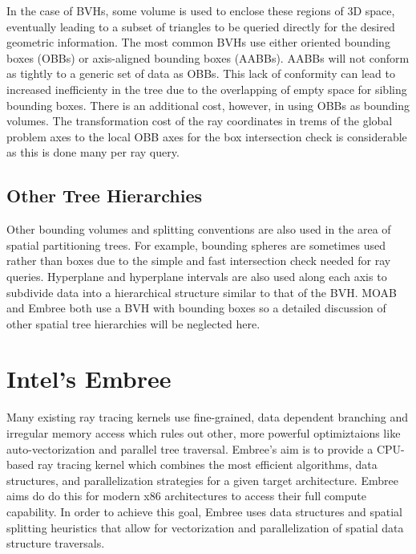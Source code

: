 \documentclass{anstrans}
\begin{document}
In the case of BVHs, some volume is used to enclose these regions of 3D space, eventually leading to a subset of triangles to be queried directly for the desired geometric information. The most common BVHs use either oriented bounding boxes (OBBs) or axis-aligned bounding boxes (AABBs). AABBs will not conform as tightly to a generic set of data as OBBs. This lack of conformity can lead to increased inefficienty in the tree due to the overlapping of empty space for sibling bounding boxes. There is an additional cost, however, in using OBBs as bounding volumes. The transformation cost of the ray coordinates in trems of the global problem axes to the local OBB axes for the box intersection check is considerable as this is done many per ray query. 

\subsection{Other Tree Hierarchies} 

Other bounding volumes and splitting conventions are also used in the area of spatial partitioning trees. For example, bounding spheres are sometimes used rather than boxes due to the simple and fast intersection check needed for ray queries. Hyperplane and hyperplane intervals are also used along each axis to subdivide data into a hierarchical structure similar to that of the BVH. MOAB and Embree both use a BVH with bounding boxes so a detailed discussion of other spatial tree hierarchies will be neglected here.

\section{Intel's Embree}

Many existing ray tracing kernels use fine-grained, data dependent branching and irregular memory access which rules out other, more powerful optimiztaions like auto-vectorization and parallel tree traversal. Embree's aim is to provide a CPU-based ray tracing kernel which combines the most efficient algorithms, data structures, and parallelization strategies for a given target architecture. Embree aims do do this for modern x86 architectures to access their full compute capability. In order to achieve this goal, Embree uses data structures and spatial splitting heuristics that allow for vectorization and parallelization of spatial data structure traversals. \cite{embree} 
\end{document}
